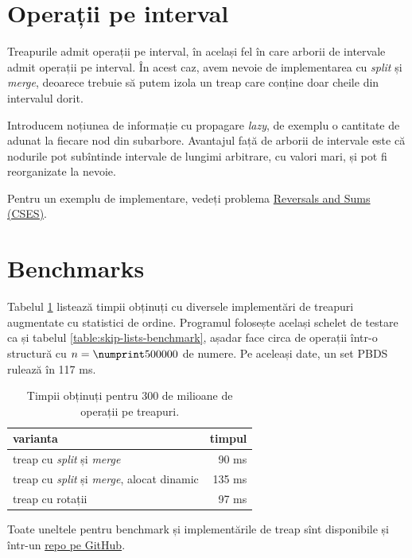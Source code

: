 \documentclass[../main.tex]{subfiles}
\begin{document}
\section{Operații pe interval}

Treapurile admit operații pe interval, în același fel în care arborii de intervale admit operații pe interval. În acest caz, avem nevoie de implementarea cu \textit{split} și \textit{merge}, deoarece trebuie să putem izola un treap care conține doar cheile din intervalul dorit.

Introducem noțiunea de informație cu propagare \textit{lazy}, de exemplu o cantitate de adunat la fiecare nod din subarbore. Avantajul față de arborii de intervale este că nodurile pot subîntinde intervale de lungimi arbitrare, cu valori mari, și pot fi reorganizate la nevoie.

Pentru un exemplu de implementare, vedeți problema \hyperref[problem:reversals-and-sums]{Reversals and Sums (CSES)}.


\section{Benchmarks}

Tabelul \ref{table:treaps-benchmark} listează timpii obținuți cu diversele implementări de treapuri augmentate cu statistici de ordine. Programul folosește același schelet de testare ca și tabelul \ref{table:skip-lists-benchmark}, așadar face circa  de operații într-o structură cu $n = \np{500000}$ de numere. Pe aceleași date, un set PBDS rulează în 117 ms.

\begin{table}[H]
  \centering
  \begin{tabular}{lr}
    \textbf{varianta} & \textbf{timpul}\\
    \hline
    treap cu \textit{split} și \textit{merge} & 90 ms \\
    treap cu \textit{split} și \textit{merge}, alocat dinamic & 135 ms \\
    treap cu rotații & 97 ms \\
    \hline
  \end{tabular}

  \caption{Timpii obținuți pentru 300 de milioane de operații pe treapuri.}
  \label{table:treaps-benchmark}
\end{table}

Toate uneltele pentru benchmark și implementările de treap sînt disponibile și într-un \href{https://github.com/CatalinFrancu/nerdvana/tree/main/balanced-ds}{repo pe GitHub}.
\end{document}
